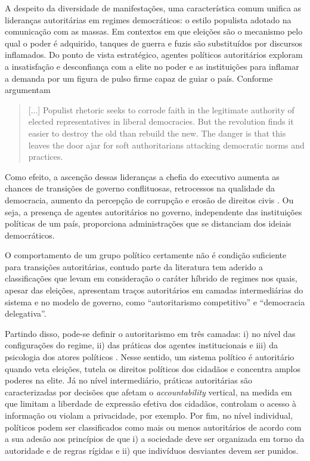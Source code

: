 \documentclass[
12pt,				%
openright,			%
twoside,			%
a4paper,			%
english,			%
french,				%
spanish,			%
brazil				%
]{abntex2}
\begin{document}
A despeito da diversidade de manifestações, uma característica comum unifica as lideranças autoritárias em regimes democráticos: o estilo populista adotado na comunicação com as massas. Em contextos em que eleições são o mecanismo pelo qual o poder é adquirido, tanques de guerra e fuzis são substituídos por discursos inflamados. Do ponto de vista estratégico, agentes políticos autoritários exploram a insatisfação e desconfiança com a elite no poder e as instituições para inflamar a demanda por um figura de pulso firme capaz de guiar o país. Conforme argumentam 

\begin{quote}
	[...] Populist rhetoric seeks to corrode faith in the legitimate
	authority of elected representatives in liberal democracies. But the revolution finds it easier to destroy the old than rebuild the new. The danger is that this leaves the door ajar for soft authoritarians attacking democratic norms and practices. \cite{norris2019cultural}
\end{quote}

Como efeito, a ascenção dessas lideranças a chefia do executivo aumenta as chances de transições de governo conflituosas, retrocessos na qualidade da democracia, aumento da percepção de corrupção e erosão de direitos civis \cite{mounk2018thepopulist}. Ou seja, a presença de agentes autoritários no governo, independente das instituições políticas de um país, proporciona administrações que se distanciam dos ideiais democráticos.

O comportamento de um grupo político certamente não é condição suficiente para transições autoritárias, contudo  parte da literatura tem aderido a classificações que levam em consideração o caráter híbrido de regimes nos quais, apesar das eleições, apresentam traços autoritários em camadas intermediárias do sistema e no modelo de governo, como ``autoritarismo competitivo''\cite{levitsky2002elections,levitsky2006competitive} e ``democracia delegativa''\cite{o1994delegative}.
 
Partindo disso, pode-se definir o autoritarismo em três camadas: i) no nível das configurações do regime, ii) das práticas dos agentes institucionais e iii) da psicologia dos atores políticos \cite{glasius2018authoritarianism}. Nesse sentido, um sistema político é autoritário quando veta eleições, tutela os direitos políticos dos cidadãos e concentra amplos poderes na elite. Já no nível intermediário, práticas autoritárias são caracterizadas por decisões que afetam o \emph{accountability} vertical, na medida em que limitam a liberdade de expressão efetiva dos cidadãos, controlam o acesso à informação ou violam a privacidade, por exemplo. Por fim, no nível individual, políticos podem ser classificados como mais ou menos autoritários de acordo com a sua adesão aos princípios de que i) a sociedade deve ser organizada em torno da autoridade e de regras rígidas e ii) que indivíduos desviantes devem ser punidos.
\end{document}

